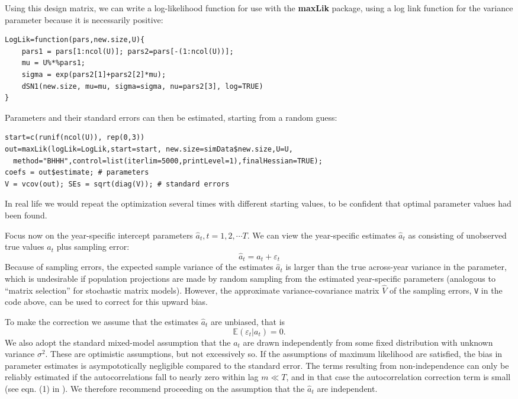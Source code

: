 \documentclass[12pt]{article}
\newcommand{\be}{\begin{equation}}
\newcommand{\ee}{\end{equation}}
\begin{document}
\begin{spacing}{1.35}
Using this design matrix, we can write a log-likelihood function for use with 
the \textbf{maxLik} package, using a log link function for the variance parameter 
because it is necessarily positive: 
\begin{lstlisting}
LogLik=function(pars,new.size,U){
    pars1 = pars[1:ncol(U)]; pars2=pars[-(1:ncol(U))];
    mu = U%*%pars1;  
    sigma = exp(pars2[1]+pars2[2]*mu);
    dSN1(new.size, mu=mu, sigma=sigma, nu=pars2[3], log=TRUE)
}
\end{lstlisting} 
Parameters and their standard errors can then be estimated, starting from a random guess: 
\begin{lstlisting}
start=c(runif(ncol(U)), rep(0,3))
out=maxLik(logLik=LogLik,start=start, new.size=simData$new.size,U=U,
  method="BHHH",control=list(iterlim=5000,printLevel=1),finalHessian=TRUE);
coefs = out$estimate; # parameters
V = vcov(out); SEs = sqrt(diag(V));	# standard errors 
\end{lstlisting}  
In real life we would repeat the optimization several times with different starting values, 
to be confident that optimal parameter values had been found. 

Focus now on the year-specific intercept parameters $\hat{a}_t, t = 1,2,\cdots T$. 
We can view the year-specific estimates $\hat{a}_t$ as consisting of unobserved true values $a_t$ plus sampling error:
\be
\hat{a}_t= a_t + \varepsilon_t 
\ee
Because of sampling errors, the expected sample variance of the estimates $\hat{a}_t$ is larger 
than the true across-year variance in the parameter, which is undesirable if population projections are made
by random sampling from the estimated year-specific parameters (analogous to ``matrix selection'' for stochastic
matrix models). However, the approximate variance-covariance matrix $\hat{V}$ of the sampling errors, \texttt{V} in the code 
above, can be used to correct for this upward bias.   

To make the correction we assume that the estimates $\hat{a}_t$ are unbiased, that is
\be
\mathbb{E}(\varepsilon_t \vert a_t) = 0.    
\ee
We also adopt the standard mixed-model assumption that the $a_t$ are drawn 
independently from some fixed distribution with unknown variance $\sigma^2$. 
These are optimistic assumptions, but not excessively so. If the assumptions of maximum likelihood are satisfied, 
the bias in parameter estimates is asympototically negligible compared to the standard error. 
The terms resulting from non-independence can only be reliably estimated if 
the autocorrelations fall to nearly zero within lag $m \ll T$, 
and in that case the autocorrelation correction term is small (see eqn. (1) in \citet{gould-nichols-1998}). 
We therefore recommend proceeding on the assumption that the $\hat{a}_t$ are independent. 


\end{spacing}
\end{document}

